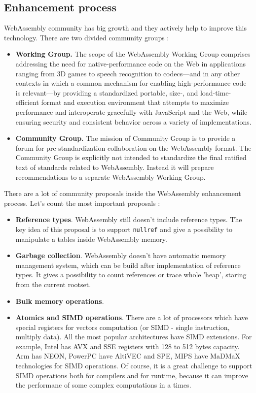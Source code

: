 \subsection{Enhancement process}
WebAssembly community has big growth and they actively help to improve this technology.
There are two divided community groups : \cite{wasm_wg} \cite{wasm_cg}
\begin{itemize}
  \item \textbf{Working Group.}  The scope of the WebAssembly Working Group comprises addressing the need for native-performance code on the Web in applications ranging from 3D games to speech recognition to codecs—and in any other contexts in which a common mechanism for enabling high-performance code is relevant—by providing a standardized portable, size-, and load-time-efficient format and execution environment that attempts to maximize performance and interoperate gracefully with JavaScript and the Web, while ensuring security and consistent behavior across a variety of implementations.
  
  \item \textbf{Community Group.} The mission of Community Group is to provide a forum for pre-standardization collaboration on the WebAssembly format.
        The Community Group is explicitly not intended to standardize the final ratified text of standards related to WebAssembly. 
        Instead it will prepare recommendations to a separate WebAssembly Working Group.
\end{itemize}

There are a lot of community proposals inside the WebAssembly enhancement process. Let's count the most important proposals :
\begin{itemize}
\item \textbf{Reference types}. WebAssembly still doesn't include reference types. The key idea of this proposal is to support
      \texttt{nullref} and give a possibility to manipulate a tables inside WebAssembly memory.
\item \textbf{Garbage collection}. WebAssembly doesn't have automatic memory management system, which can be build after implementation of reference types. It gives a possibility to count references or trace whole 'heap', staring from the current rootset. 
\item \textbf{Bulk memory operations}. 
\item \textbf{Atomics and SIMD operations}. There are a lot of processors which have special registers for vectors computation
  (or SIMD - single instruction, multiply data). All the most popular architectures have SIMD extensions.
   For example, Intel has AVX and SSE registers with 128 to 512 bytes capacity.
   Arm has NEON, PowerPC have AltiVEC and SPE, MIPS have MaDMaX technologies for SIMD operations.
   Of course, it is a great challenge to support SIMD operations both for compilers and for runtime, because it can improve the performanc of some complex computations in a times.
\end{itemize}
  
